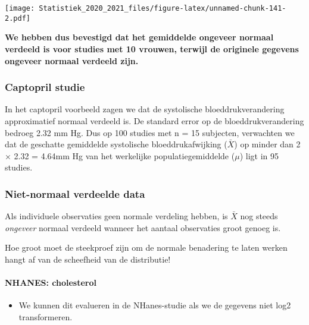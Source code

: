 \documentclass[
  12pt,dutch,coursenotes]{book}
\providecommand{\tightlist}{%
  \setlength{\itemsep}{0pt}\setlength{\parskip}{0pt}}
\theoremstyle{definition}
\theoremstyle{definition}
\theoremstyle{definition}
\theoremstyle{remark}
\begin{document}
\texttt{[image: Statistiek\_2020\_2021\_files/figure-latex/unnamed-chunk-141-2.pdf]}

\textbf{We hebben dus bevestigd dat het gemiddelde ongeveer normaal verdeeld is voor studies met 10 vrouwen, terwijl de originele gegevens ongeveer normaal verdeeld zijn.}

\hypertarget{captopril-studie}{%
\subsubsection{Captopril studie}\label{captopril-studie}}

In het captopril voorbeeld zagen we dat de systolische bloeddrukverandering approximatief normaal verdeeld is.
De standard error op de bloeddrukverandering bedroeg 2.32 mm Hg.
Dus op 100 studies met n = 15 subjecten, verwachten we dat de geschatte gemiddelde systolische bloeddrukafwijking (\(\bar X\)) op minder dan 2 × 2.32 = 4.64mm Hg van het werkelijke populatiegemiddelde (\(\mu\)) ligt in 95 studies.

\hypertarget{niet-normaal-verdeelde-data}{%
\subsubsection{Niet-normaal verdeelde data}\label{niet-normaal-verdeelde-data}}

Als individuele observaties geen normale verdeling hebben, is \(\bar X\) nog steeds \textit{ongeveer} normaal verdeeld
wanneer het aantaal observaties groot genoeg is.

Hoe groot moet de steekproef zijn om de normale benadering te laten werken hangt af van de scheefheid van de distributie!

\hypertarget{nhanes-cholesterol-1}{%
\paragraph{NHANES: cholesterol}\label{nhanes-cholesterol-1}}

\begin{itemize}
\tightlist
\item
  We kunnen dit evalueren in de NHanes-studie als we de gegevens niet log2 transformeren.
\end{itemize}
\end{document}
